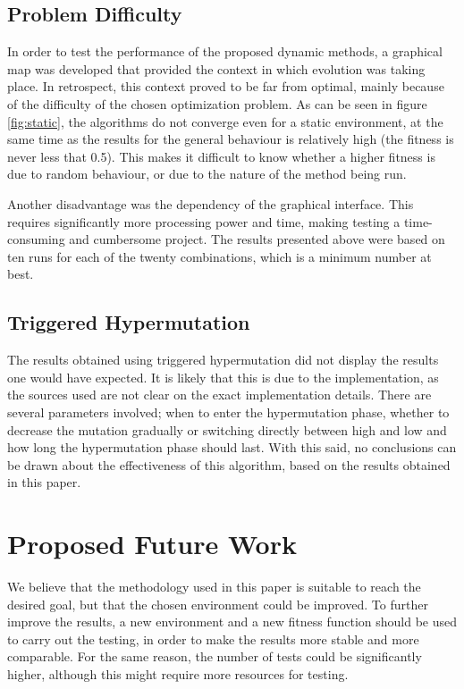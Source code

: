 \documentclass[a4paper,12pt]{article}
\begin{document}
\subsection{Problem Difficulty}
In order to test the performance of the proposed dynamic methods, a graphical map was developed that provided the context in which evolution was taking place. In retrospect, this context proved to be far from optimal, mainly because of the difficulty of the chosen optimization problem. As can be seen in figure \ref{fig:static}, the algorithms do not converge even for a static environment, at the same time as the results for the general behaviour is relatively high (the fitness is never less that 0.5). This makes it difficult to know whether a higher fitness is due to random behaviour, or due to the nature of the method being run.

Another disadvantage was the dependency of the graphical interface. This requires significantly more processing power and time, making testing a time-consuming and cumbersome project. The results presented above were based on ten runs for each of the twenty combinations, which is a minimum number at best.

\subsection{Triggered Hypermutation}
The results obtained using triggered hypermutation did not display the results one would have expected. It is likely that this is due to the implementation, as the sources used are not clear on the exact implementation details. There are several parameters involved; when to enter the hypermutation phase, whether to decrease the mutation gradually or switching directly between high and low and how long the hypermutation phase should last. With this said, no conclusions can be drawn about the effectiveness of this algorithm, based on the results obtained in this paper.

\section{Proposed Future Work}
We believe that the methodology used in this paper is suitable to reach the desired goal, but that the chosen environment could be improved. To further improve the results, a new environment and a new fitness function should be used to carry out the testing, in order to make the results more stable and more comparable. For the same reason, the number of tests could be significantly higher, although this might require more resources for testing.
\end{document}
